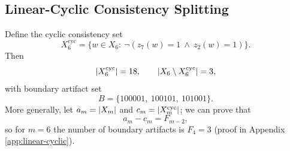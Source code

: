 \subsection{Linear-Cyclic Consistency Splitting}

Define the cyclic consistency set
\[
X_6^{\mathrm{cyc}}=\{w\in X_6:\ \neg(z_7(w)=1\ \wedge\ z_2(w)=1)\}.
\]
Then
\[
\left\lvert X_6^{\mathrm{cyc}}\right\rvert=18,\qquad \left\lvert X_6\setminus X_6^{\mathrm{cyc}}\right\rvert=3,
\]
with boundary artifact set
\[
B=\{100001,\ 100101,\ 101001\}.
\]
More generally, let $a_m=\left\lvert X_m\right\rvert$ and $c_m=\left\lvert X_m^{\mathrm{cyc}}\right\rvert$; we can prove that
\[
a_m-c_m=F_{m-2},
\]
so for $m=6$ the number of boundary artifacts is $F_4=3$ (proof in Appendix \ref{app:linear-cyclic}).
